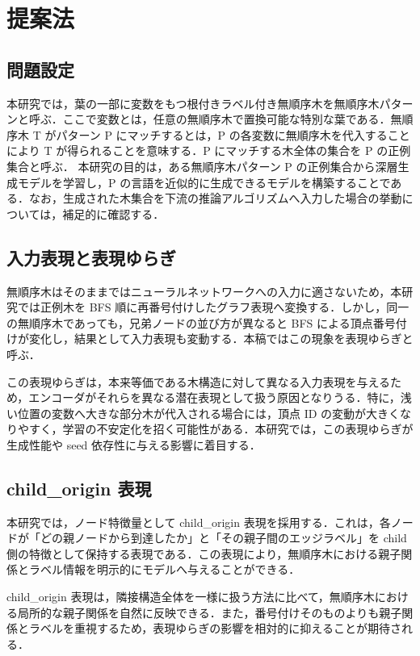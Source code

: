 \documentclass[submit,techrep,noauthor]{ipsj}
\begin{document}
\section{提案法}

\subsection{問題設定}

本研究では，葉の一部に変数をもつ根付きラベル付き無順序木を無順序木パターンと呼ぶ．ここで変数とは，任意の無順序木で置換可能な特別な葉である．無順序木 T がパターン P にマッチするとは，P の各変数に無順序木を代入することにより T が得られることを意味する．P にマッチする木全体の集合を P の正例集合と呼ぶ．
本研究の目的は，ある無順序木パターン P の正例集合から深層生成モデルを学習し，P の言語を近似的に生成できるモデルを構築することである．なお，生成された木集合を下流の推論アルゴリズムへ入力した場合の挙動については，補足的に確認する．

\subsection{入力表現と表現ゆらぎ}

無順序木はそのままではニューラルネットワークへの入力に適さないため，本研究では正例木を BFS 順に再番号付けしたグラフ表現へ変換する．しかし，同一の無順序木であっても，兄弟ノードの並び方が異なると BFS による頂点番号付けが変化し，結果として入力表現も変動する．本稿ではこの現象を表現ゆらぎと呼ぶ．

この表現ゆらぎは，本来等価である木構造に対して異なる入力表現を与えるため，エンコーダがそれらを異なる潜在表現として扱う原因となりうる．特に，浅い位置の変数へ大きな部分木が代入される場合には，頂点 ID の変動が大きくなりやすく，学習の不安定化を招く可能性がある．本研究では，この表現ゆらぎが生成性能や seed 依存性に与える影響に着目する．

\subsection{child\_origin 表現}

本研究では，ノード特徴量として child\_origin 表現を採用する．これは，各ノードが「どの親ノードから到達したか」と「その親子間のエッジラベル」を child 側の特徴として保持する表現である．この表現により，無順序木における親子関係とラベル情報を明示的にモデルへ与えることができる．

child\_origin 表現は，隣接構造全体を一様に扱う方法に比べて，無順序木における局所的な親子関係を自然に反映できる．また，番号付けそのものよりも親子関係とラベルを重視するため，表現ゆらぎの影響を相対的に抑えることが期待される．
\end{document}
